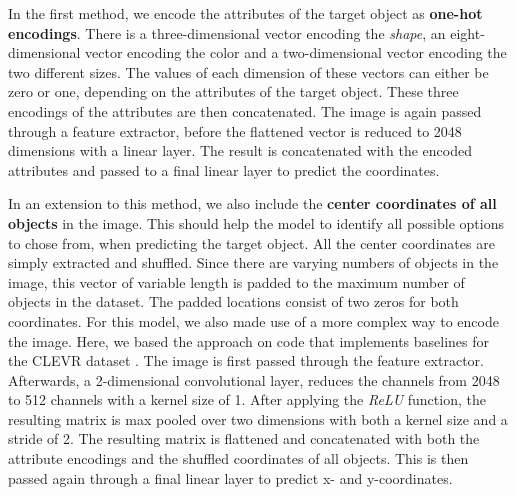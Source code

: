 In the first method, we encode the attributes of the target object as \textbf{one-hot encodings}.
There is a three-dimensional vector encoding the \emph{shape}, an eight-dimensional vector encoding the color and a two-dimensional vector encoding the two different sizes.
The values of each dimension of these vectors can either be zero or one, depending on the attributes of the target object.
These three encodings of the attributes are then concatenated.
The image is again passed through a feature extractor, before the flattened vector is reduced to 2048 dimensions with a linear layer.
The result is concatenated with the encoded attributes and passed to a final linear layer to predict the coordinates.

In an extension to this method, we also include the \textbf{center coordinates of all objects} in the image.
This should help the model to identify all possible options to chose from, when predicting the target object.
All the center coordinates are simply extracted and shuffled.
Since there are varying numbers of objects in the image, this vector of variable length is padded to the maximum number of objects in the dataset.
The padded locations consist of two zeros for both coordinates.
For this model, we also made use of a more complex way to encode the image.
Here, we based the approach on code that implements baselines for the CLEVR dataset \citep{Johnson2017}.
The image is first passed through the feature extractor.
Afterwards, a 2-dimensional convolutional layer, reduces the channels from 2048 to 512 channels with a kernel size of 1.
After applying the \emph{ReLU} function, the resulting matrix is max pooled over two dimensions with both a kernel size and a stride of 2.
The resulting matrix is flattened and concatenated with both the attribute encodings and the shuffled coordinates of all objects.
This is then passed again through a final linear layer to predict x- and y-coordinates.

